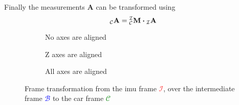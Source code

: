 Finally the measurements $\mathbf{A}$ can be transformed using
\begin{equation}
	\vincs{A}{c} = \mtf{i}{c} \vdot \vincs{A}{i}
\end{equation}
\begin{figure}[htb]
	\centering
	\begin{subfigure}[b]{0.3\textwidth}
		\centering
		
		\caption{No axes are aligned}
		\label{fig:tikz_frame_transformation_init}
	\end{subfigure}
	\hfill
	\begin{subfigure}[b]{0.3\textwidth}
		\centering
		
		\caption{Z axes are aligned}
		\label{fig:tikz_frame_transformation_intermediate}
	\end{subfigure}
	\hfill
	\begin{subfigure}[b]{0.3\textwidth}
		\centering
		
		\caption{All axes are aligned}
		\label{fig:tikz_frame_transformation_final}
	\end{subfigure}
	\caption[Frame transformation]{Frame transformation from the \gls{imu} frame \textcolor{red}{$\mathcal{I}$}, over the intermediate frame \textcolor{blue}{$\mathcal{B}$} to the car frame \textcolor{green}{$\mathcal{C}$}}
	\label{fig:tikz_frame_transformation}
\end{figure}


